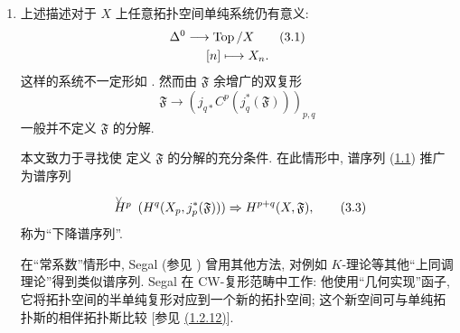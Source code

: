 \begin{enumerate}
注意, 典范松弛分解的形成与\pageoriginale{}限制到开子集以及闭浸入的正像交换. 因而:
\begin{enumerate}
\renewcommand{\theenumi}{\alph{enumi}}
\renewcommand{\labelenumi}{\theenumi)}
\item 若 $\Uu$ 为开覆盖,
\begin{equation*}
\mathcal{C}^q(\Uu,C^p(\mathfrak{F}))=j_{q\ast}j_q^{\ast}
C^p(\mathfrak{F})=j_{q\ast}C^p(j_q^{\ast}\mathfrak{F});\tag{2.3}
\end{equation*}
\item 若 $\Uu$ 为局部有限的闭覆盖,
\begin{equation*}
C^p(\mathcal{C}^q(\Uu,\mathfrak{F}))=C^p(j_{q\ast}j_q^{\ast}
\mathfrak{F})=j_{q\ast}C^p(j_q^{\ast}\mathfrak{F}){\quoi}.\tag{2.4}
\end{equation*}
\end{enumerate}
因此, 为统一描述  与 ,
只须对每个 $q$ 取 $X_q$ 上 $j_q^{\ast}(\mathfrak{F})$ 的典范松弛分解,
再对该分解应用函子 $j_{q\ast}$.

\item 上述描述对于 $X$ 上任意拓扑空间单纯系统仍有意义:
\hypertarget{sga4.exp.Vbis.equation.3.1}{}\begin{gather*}
\Delta^0\longrightarrow\operatorname{Top}/X\tag{3.1}\\
[n]\longmapsto X_n.\notag
\end{gather*}
这样的系统不一定形如 .
然而由 $\mathfrak{F}$ 余增广的双复形
\begin{equation*}
\mathfrak{F}\longrightarrow
(j_{q\ast}C^p(j_q^{\ast}(\mathfrak{F})))_{p,q}\tag{3.2}
\end{equation*}
一般并不定义 $\mathfrak{F}$ 的分解.

本文致力于寻找使  定义 $\mathfrak{F}$ 的分解的充分条件.
在此情形中, 谱序列 (\hyperref[Vbis.subsec1.1]{1.1}) 推广为谱序列
\begin{equation*}
\Hv{p}(H^q(X_p,j_p^{\ast}(\mathfrak{F})))\Rightarrow
H^{p+q}(X,\mathfrak{F}),\tag{3.3}
\end{equation*}
称为“下降谱序列”.

在\pageoriginale“常系数”情形中, Segal (参见 \cite{sga4.exp.Vbis.bib.8})
曾用其他方法, 对例如 $K$-理论等其他“上同调理论”得到类似谱序列.
Segal 在 CW-复形范畴中工作: 他使用“几何实现”函子,
它将拓扑空间的半单纯复形对应到一个新的拓扑空间;
这个新空间可与单纯拓扑斯的相伴拓扑斯比较
[参见 \hyperref[Vbis.prop1.2.12]{(1.2.12)}].


\end{enumerate}
